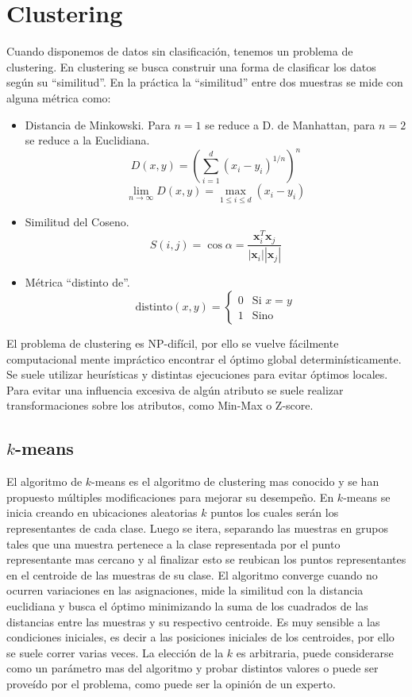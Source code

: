 \documentclass[10pt,a4paper]{article}
\begin{document}
\section{Clustering}
Cuando disponemos de datos sin clasificación, tenemos un problema de clustering. En clustering se busca construir una forma de clasificar los datos según su ``similitud''. En la práctica la ``similitud'' entre dos muestras se mide con alguna métrica \cite{xu2005survey} como:
\begin{itemize}
\item Distancia de Minkowski. Para $n=1$ se reduce a D. de Manhattan, para $n=2$ se reduce a la Euclidiana.
\[
D(x, y) = \left(\sum_{i=1}^d \left(x_i-y_i\right)^{1/n}\right)^n
\]
\[
\lim_{n \to \infty} D(x, y) = \max_{1 \leq i \leq d} \left( x_i - y_i \right)
\]
\item Similitud del Coseno.
  \[
  S(i, j) = \cos \alpha = \frac{\boldsymbol{x}_i^T\boldsymbol{x}_j}{|\boldsymbol{x}_i||\boldsymbol{x}_j|}
  \]
\item Métrica ``distinto de''\cite{larose2014discovering}.
  \[
  \text{distinto}(x, y) =
  \begin{cases}
    0 & \text{Si } x = y \\
    1 & \text{Sino}
  \end{cases}
  \]
\end{itemize}

El problema de clustering es NP-difícil\cite{aloise2009np}, por ello se vuelve fácilmente computacional mente impráctico encontrar el óptimo global determinísticamente. Se suele utilizar heurísticas y distintas ejecuciones para evitar óptimos locales.
Para evitar una influencia excesiva de algún atributo se suele realizar transformaciones sobre los atributos, como Min-Max o Z-score.

\subsection{\texorpdfstring{$k$}{k}-means}
El algoritmo de $k$-means es el algoritmo de clustering mas conocido y se han propuesto múltiples modificaciones para mejorar su desempeño. %
En $k$-means se inicia creando en ubicaciones aleatorias $k$ puntos los cuales serán los representantes de cada clase. Luego se itera, separando las muestras en grupos tales que una muestra pertenece a la clase representada por el punto representante mas cercano y al finalizar esto se reubican los puntos representantes en el centroide de las muestras de su clase. El algoritmo converge cuando no ocurren variaciones en las asignaciones, mide la similitud con la distancia euclidiana y busca el óptimo minimizando la suma de los cuadrados de las distancias entre las muestras y su respectivo centroide. Es muy sensible a las condiciones iniciales, es decir a las posiciones iniciales de los centroides, por ello se suele correr varias veces. La elección de la $k$ es arbitraria, puede considerarse como un parámetro mas del algoritmo y probar distintos valores o puede ser proveído por el problema, como puede ser la opinión de un experto.
\end{document}
